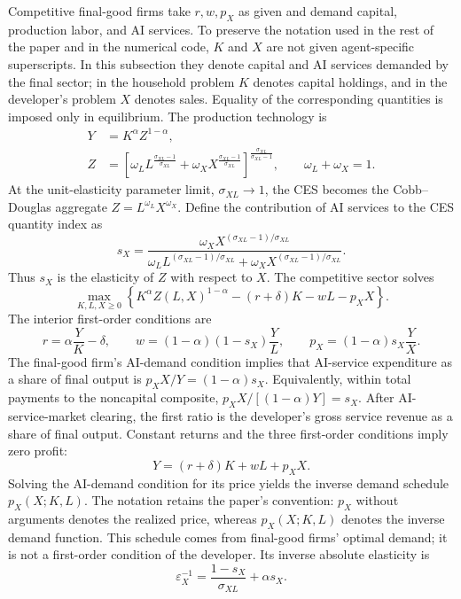 Competitive final-good firms take \(r,w,p_X\) as given and demand capital,
production labor, and AI services. To preserve the notation used in the rest of
the paper and in the numerical code, \(K\) and \(X\) are not given agent-specific
superscripts. In this subsection they denote capital and AI services demanded by
the final sector; in the household problem \(K\) denotes capital holdings, and in
the developer's problem \(X\) denotes sales. Equality of the corresponding
quantities is imposed only in equilibrium. The production technology is
\begin{align}
 Y&=K^\alpha Z^{1-\alpha},\\
 Z&=\left[\omega_L L^{\frac{\sigma_{XL}-1}{\sigma_{XL}}}
 +\omega_X X^{\frac{\sigma_{XL}-1}{\sigma_{XL}}}\right]^{
 \frac{\sigma_{XL}}{\sigma_{XL}-1}},
 \qquad \omega_L+\omega_X=1.
 \label{eq:axm-final-production}
\end{align}
At the unit-elasticity parameter limit, \(\sigma_{XL}\to1\), the CES becomes the
Cobb--Douglas aggregate \(Z=L^{\omega_L}X^{\omega_X}\). Define the contribution
of AI services to the CES quantity index as
\begin{equation}
 s_X=\frac{\omega_X X^{(\sigma_{XL}-1)/\sigma_{XL}}}
 {\omega_L L^{(\sigma_{XL}-1)/\sigma_{XL}}
 +\omega_X X^{(\sigma_{XL}-1)/\sigma_{XL}}}.
 \label{eq:axm-sx}
\end{equation}
Thus \(s_X\) is the elasticity of \(Z\) with respect to \(X\). The competitive
sector solves
\begin{equation}
 \max_{K,L,X\geq0}\left\{K^\alpha Z(L,X)^{1-\alpha}
 -(r+\delta)K-wL-p_XX\right\}.
 \label{eq:axm-final-firm-problem}
\end{equation}
The interior first-order conditions are
\begin{equation}
 r=\alpha\frac{Y}{K}-\delta,\qquad
 w=(1-\alpha)(1-s_X)\frac{Y}{L},\qquad
 p_X=(1-\alpha)s_X\frac{Y}{X}.
 \label{eq:axm-factor-prices}
\end{equation}
The final-good firm's AI-demand condition implies that AI-service expenditure
as a share of final output is
\(p_XX/Y=(1-\alpha)s_X\). Equivalently, within total payments to the
noncapital composite, \(p_XX/[(1-\alpha)Y]=s_X\). After AI-service-market
clearing, the first ratio is the developer's gross service revenue as a share of
final output.
Constant returns and the three first-order conditions imply zero profit:
\begin{equation}
 Y=(r+\delta)K+wL+p_XX.
 \label{eq:axm-final-zero-profit}
\end{equation}
Solving the AI-demand condition for its price yields the inverse demand schedule
\(p_X(X;K,L)\). The notation retains the paper's convention: \(p_X\) without
arguments denotes the realized price, whereas \(p_X(X;K,L)\) denotes the inverse
demand function. This schedule comes from final-good firms' optimal demand; it is
not a first-order condition of the developer. Its inverse absolute elasticity is
\begin{equation}
 \varepsilon_X^{-1}=\frac{1-s_X}{\sigma_{XL}}+\alpha s_X.
 \label{eq:axm-inverse-elasticity}
\end{equation}

